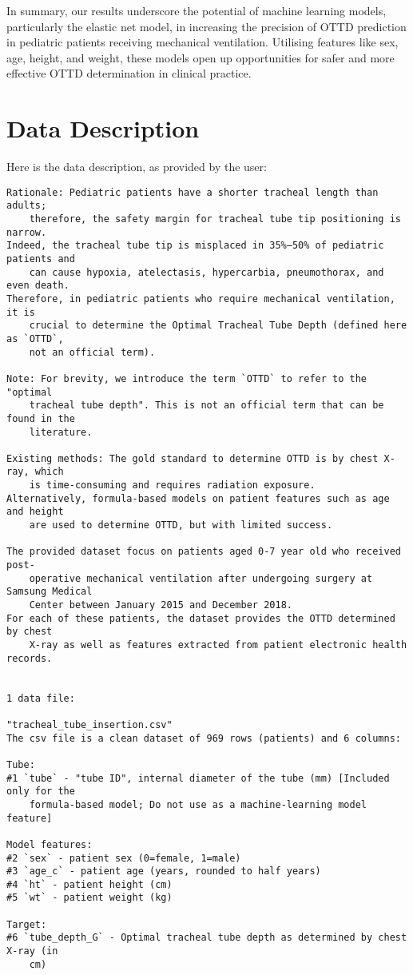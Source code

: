 \documentclass[11pt]{article}
\begin{document}
In summary, our results underscore the potential of machine learning models, particularly the elastic net model, in increasing the precision of OTTD prediction in pediatric patients receiving mechanical ventilation. Utilising features like sex, age, height, and weight, these models open up opportunities for safer and more effective OTTD determination in clinical practice.


\clearpage
\appendix

\section{Data Description} \label{sec:data_description} Here is the data description, as provided by the user:

\begin{Verbatim}[tabsize=4]
Rationale: Pediatric patients have a shorter tracheal length than adults;
	therefore, the safety margin for tracheal tube tip positioning is narrow.
Indeed, the tracheal tube tip is misplaced in 35%–50% of pediatric patients and
	can cause hypoxia, atelectasis, hypercarbia, pneumothorax, and even death.
Therefore, in pediatric patients who require mechanical ventilation, it is
	crucial to determine the Optimal Tracheal Tube Depth (defined here as `OTTD`,
	not an official term).

Note: For brevity, we introduce the term `OTTD` to refer to the "optimal
	tracheal tube depth". This is not an official term that can be found in the
	literature.

Existing methods: The gold standard to determine OTTD is by chest X-ray, which
	is time-consuming and requires radiation exposure.
Alternatively, formula-based models on patient features such as age and height
	are used to determine OTTD, but with limited success.

The provided dataset focus on patients aged 0-7 year old who received post-
	operative mechanical ventilation after undergoing surgery at Samsung Medical
	Center between January 2015 and December 2018.
For each of these patients, the dataset provides the OTTD determined by chest
	X-ray as well as features extracted from patient electronic health records.


1 data file:

"tracheal_tube_insertion.csv"
The csv file is a clean dataset of 969 rows (patients) and 6 columns:

Tube:
#1 `tube` - "tube ID", internal diameter of the tube (mm) [Included only for the
	formula-based model; Do not use as a machine-learning model feature]

Model features:
#2 `sex` - patient sex (0=female, 1=male)
#3 `age_c` - patient age (years, rounded to half years)
#4 `ht` - patient height (cm)
#5 `wt` - patient weight (kg)

Target:
#6 `tube_depth_G` - Optimal tracheal tube depth as determined by chest X-ray (in
	cm)



\end{Verbatim}
\end{document}
